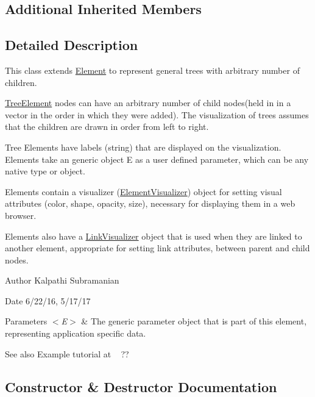 \subsection*{Additional Inherited Members}


\subsection{Detailed Description}
This class extends \mbox{\hyperlink{classbridges_1_1base_1_1_element}{Element}} to represent general trees with arbitrary number of children. 

\mbox{\hyperlink{classbridges_1_1base_1_1_tree_element}{Tree\+Element}} nodes can have an arbitrary number of child nodes(held in in a vector in the order in which they were added). The visualization of trees assumes that the children are drawn in order from left to right.

Tree Elements have labels (string) that are displayed on the visualization. Elements take an generic object E as a user defined parameter, which can be any native type or object.

Elements contain a visualizer (\mbox{\hyperlink{classbridges_1_1base_1_1_element_visualizer}{Element\+Visualizer}}) object for setting visual attributes (color, shape, opacity, size), necessary for displaying them in a web browser.

Elements also have a \mbox{\hyperlink{classbridges_1_1base_1_1_link_visualizer}{Link\+Visualizer}} object that is used when they are linked to another element, appropriate for setting link attributes, between parent and child nodes.

\begin{DoxyAuthor}{Author}
Kalpathi Subramanian
\end{DoxyAuthor}
\begin{DoxyDate}{Date}
6/22/16, 5/17/17
\end{DoxyDate}

\begin{DoxyParams}{Parameters}
{\em $<$\+E$>$} & The generic parameter object that is part of this element, representing application specific data.\\
\hline
\end{DoxyParams}
\begin{DoxySeeAlso}{See also}
Example tutorial at ~\newline
 ?? 
\end{DoxySeeAlso}


\subsection{Constructor \& Destructor Documentation}
\mbox{\label{classbridges_1_1base_1_1_tree_element_ab1af682e9304f5427e308ba5f43d7a9a}} 
